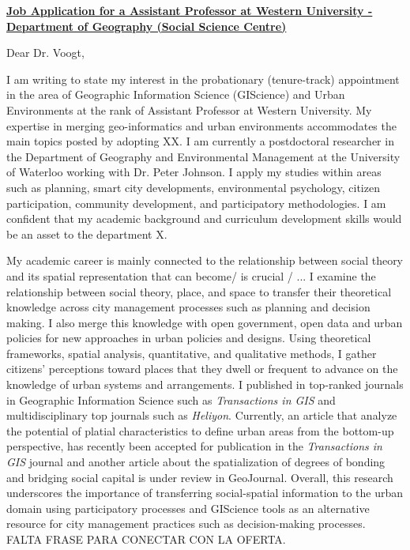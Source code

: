\textbf{\underline{Job Application for a Assistant Professor at Western University - Department of Geography (Social Science Centre)}}



Dear Dr. Voogt,


I am writing to state my interest in the probationary (tenure-track) appointment in the area of Geographic Information Science (GIScience) and Urban Environments at the rank of Assistant Professor at Western University. My expertise in merging geo-informatics and urban environments accommodates the main topics posted by adopting XX. I am currently a postdoctoral researcher in the Department of Geography and Environmental Management at the University of Waterloo working with Dr. Peter Johnson. I apply my studies within areas such as planning, smart city developments, environmental psychology, citizen participation, community development, and participatory methodologies. I am confident that my academic background and curriculum development skills would be an asset to the department X.


My academic career is mainly connected to the relationship between social theory and its spatial representation that can become/ is crucial / ... I examine the relationship between social theory, place, and space to transfer their theoretical knowledge across city management processes such as planning and decision making. I also merge this knowledge with open government, open data and urban policies for new approaches in urban policies and designs. Using theoretical frameworks, spatial analysis, quantitative, and qualitative methods, I gather citizens’ perceptions toward places that they dwell or frequent to advance on the knowledge of urban systems and arrangements. I published in top-ranked journals in Geographic Information Science such as \textit{Transactions in GIS} and multidisciplinary top journals such as \textit{Heliyon}. Currently, an article that analyze the potential of platial characteristics to define urban areas from the bottom-up perspective, has recently been accepted for publication in the \textit{Transactions in GIS} journal and another article about the spatialization of degrees of bonding and bridging social capital is under review in GeoJournal. Overall, this research underscores the importance of transferring social-spatial information to the urban domain using participatory processes and GIScience tools as an alternative resource for city management practices such as decision-making processes. FALTA FRASE PARA CONECTAR CON LA OFERTA.\par

